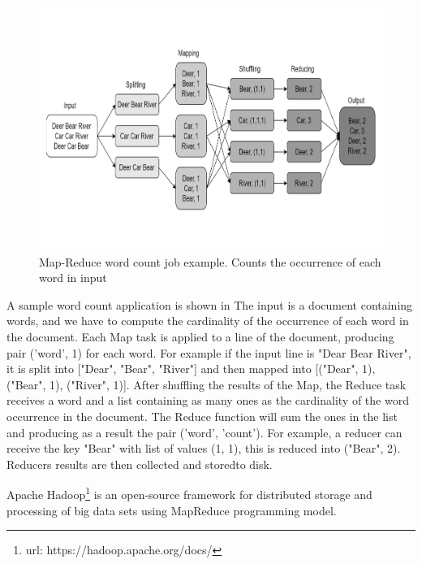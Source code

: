 \begin{figure}
	\centering
	\includegraphics[width=\columnwidth]{Images/word_count_example.pdf}  
	\caption[map-reduce model]{Map-Reduce word count job example. Counts the occurrence of each word in input}
	\label{fig:wordCountExample}
\end{figure}
A sample word count application is shown in  The input is a document containing words, and we have to compute the cardinality of the occurrence of each word in the document. Each Map task is applied to a line of the document, producing pair (’word’, 1) for each word. For example if the input line is "Dear Bear River", it is split into ["Dear", "Bear", "River"] and then mapped into [("Dear", 1), ("Bear", 1), ("River", 1)]. After shuffling the results of the Map, the Reduce task receives a word and a list containing as many ones as the cardinality of the word occurrence in the document. The Reduce function will sum the ones in the list and producing as a result the pair (’word’, ’count’). For example, a reducer can receive the key "Bear" with list of values (1, 1), this is reduced into ("Bear", 2). Reducers results are then collected and storedto disk.

Apache Hadoop\footnote{url: https://hadoop.apache.org/docs/} is an open-source framework for distributed storage and processing of big data sets using MapReduce programming model.


